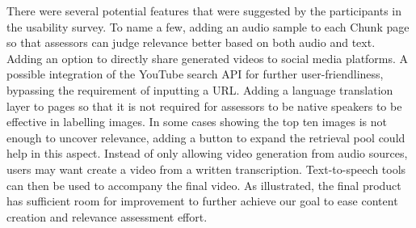 \documentclass{l4proj}
\begin{document}
There were several potential features that were suggested by the participants in the usability survey. To name a few, adding an audio sample to each Chunk page so that assessors can judge relevance better based on both audio and text. Adding an option to directly share generated videos to social media platforms. A possible integration of the YouTube search API for further user-friendliness, bypassing the requirement of inputting a URL. Adding a language translation layer to pages so that it is not required for assessors to be native speakers to be effective in labelling images. In some cases showing the top ten images is not enough to uncover relevance, adding a button to expand the retrieval pool could help in this aspect. Instead of only allowing video generation from audio sources, users may want create a video from a written transcription. Text-to-speech tools can then be used to accompany the final video. As illustrated, the final product has sufficient room for improvement to further achieve our goal to ease content creation and relevance assessment effort.


\end{document}
